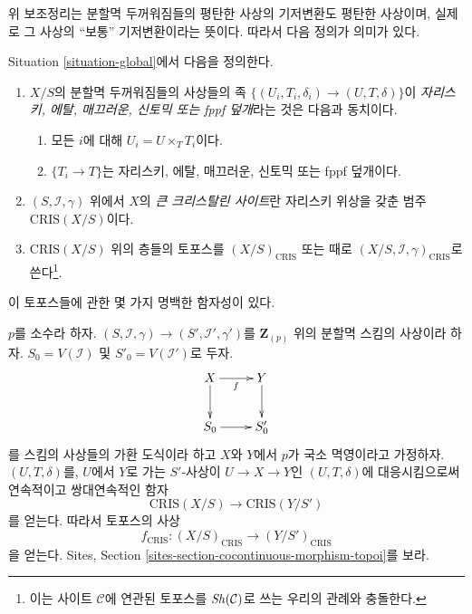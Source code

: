 \noindent
위 보조정리는 분할멱 두꺼워짐들의 평탄한 사상의 기저변환도
평탄한 사상이며, 실제로 그 사상의 ``보통'' 기저변환이라는 뜻이다.
따라서 다음 정의가 의미가 있다.

\begin{definition}
\label{definition-big-crystalline-site}
Situation \ref{situation-global}에서 다음을 정의한다.
\begin{enumerate}
\item $X/S$의 분할멱 두꺼워짐들의 사상들의 족
$\{(U_i, T_i, \delta_i) \to (U, T, \delta)\}$이
{\it 자리스키, 에탈, 매끄러운, 신토믹 또는 fppf 덮개}라는 것은
다음과 동치이다.
\begin{enumerate}
\item 모든 $i$에 대해 $U_i = U \times_T T_i$이다.
\item $\{T_i \to T\}$는 자리스키, 에탈, 매끄러운, 신토믹 또는
fppf 덮개이다.
\end{enumerate}
\item $(S, \mathcal{I}, \gamma)$ 위에서 $X$의
{\it 큰 크리스탈린 사이트}란 자리스키 위상을 갖춘 범주
$\text{CRIS}(X/S)$이다.
\item $\text{CRIS}(X/S)$ 위의 층들의 토포스를
$(X/S)_{\text{CRIS}}$ 또는 때로
$(X/S, \mathcal{I}, \gamma)_{\text{CRIS}}$로 쓴다\footnote{이는
사이트 $\mathcal{C}$에 연관된 토포스를 $\mathop{\mathit{Sh}}\nolimits(\mathcal{C})$로 쓰는
우리의 관례와 충돌한다.}.
\end{enumerate}
\end{definition}

\noindent
이 토포스들에 관한 몇 가지 명백한 함자성이 있다.

\begin{remark}[함자성]
\label{remark-functoriality-big-cris}
$p$를 소수라 하자.
$(S, \mathcal{I}, \gamma) \to (S', \mathcal{I}', \gamma')$를
$\mathbf{Z}_{(p)}$ 위의 분할멱 스킴의 사상이라 하자.
$S_0 = V(\mathcal{I})$ 및 $S'_0 = V(\mathcal{I}')$로 두자.
$$
\xymatrix{
X \ar[r]_f \ar[d] & Y \ar[d] \\
S_0 \ar[r] & S'_0
}
$$
를 스킴의 사상들의 가환 도식이라 하고 $X$와 $Y$에서 $p$가
국소 멱영이라고 가정하자. $(U, T, \delta)$를, $U$에서 $Y$로 가는
$S'$-사상이 $U \to X \to Y$인 $(U, T, \delta)$에 대응시킴으로써
연속적이고 쌍대연속적인 함자
$$
\text{CRIS}(X/S) \longrightarrow \text{CRIS}(Y/S')
$$
를 얻는다. 따라서 토포스의 사상
$$
f_{\text{CRIS}} : (X/S)_{\text{CRIS}} \longrightarrow (Y/S')_{\text{CRIS}}
$$
을 얻는다. Sites, Section \ref{sites-section-cocontinuous-morphism-topoi}를
보라.
\end{remark}

